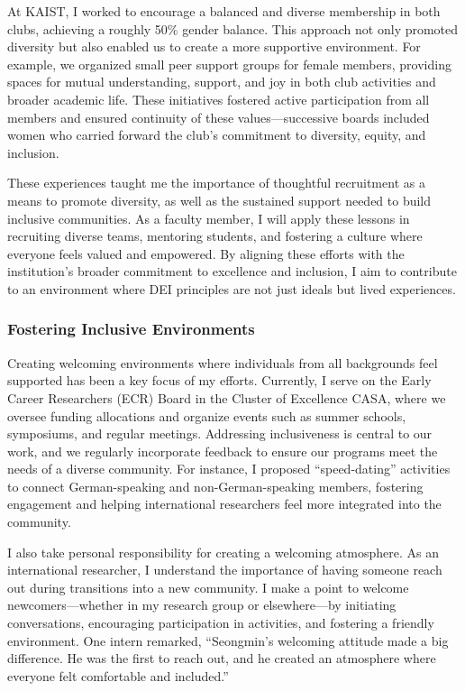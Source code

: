 \documentclass{article}
\begin{document}
At KAIST, I worked to encourage a balanced and diverse membership in both clubs, achieving a roughly 50\% gender balance. This approach not only promoted diversity but also enabled us to create a more supportive environment. For example, we organized small peer support groups for female members, providing spaces for mutual understanding, support, and joy in both club activities and broader academic life. These initiatives fostered active participation from all members and ensured continuity of these values—successive boards included women who carried forward the club's commitment to diversity, equity, and inclusion.

These experiences taught me the importance of thoughtful recruitment as a means to promote diversity, as well as the sustained support needed to build inclusive communities. As a faculty member, I will apply these lessons in recruiting diverse teams, mentoring students, and fostering a culture where everyone feels valued and empowered. By aligning these efforts with the institution's broader commitment to excellence and inclusion, I aim to contribute to an environment where DEI principles are not just ideals but lived experiences.

\subsubsection*{Fostering Inclusive Environments}

Creating welcoming environments where individuals from all backgrounds feel supported has been a key focus of my efforts. Currently, I serve on the Early Career Researchers (ECR) Board in the Cluster of Excellence CASA, where we oversee funding allocations and organize events such as summer schools, symposiums, and regular meetings. Addressing inclusiveness is central to our work, and we regularly incorporate feedback to ensure our programs meet the needs of a diverse community. For instance, I proposed “speed-dating” activities to connect German-speaking and non-German-speaking members, fostering engagement and helping international researchers feel more integrated into the community.

I also take personal responsibility for creating a welcoming atmosphere. As an international researcher, I understand the importance of having someone reach out during transitions into a new community. I make a point to welcome newcomers—whether in my research group or elsewhere—by initiating conversations, encouraging participation in activities, and fostering a friendly environment. One intern remarked, “Seongmin's welcoming attitude made a big difference. He was the first to reach out, and he created an atmosphere where everyone felt comfortable and included.”
\end{document}
